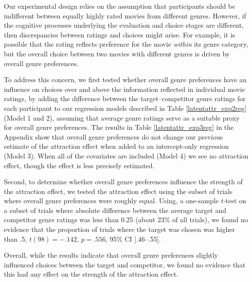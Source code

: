 \documentclass[12pt, a4paper]{article}
\begin{document}
Our experimental design relies on the assumption that participants should be indifferent between equally highly rated movies from different genres. However, if the cognitive processes underlying the evaluation and choice stages are different, then discrepancies between ratings and choices might arise. For example, it is possible that the rating reflects preference for the movie \textit{within} its genre category, but the overall choice between two movies with different genres is driven by overall genre preferences.

To address this concern, we first tested whether overall genre preferences have an influence on choices over and above the information reflected in individual movie ratings, by adding the difference between the target–competitor genre ratings for each participant to our regression models described in Table \ref{latentattr_exp2reg} (Model 1 and 2), assuming that average genre ratings serve as a suitable proxy for overall genre preferences. The results in Table \ref{latentattr_exp3reg} in the Appendix show that overall genre preferences do not change our previous estimate of the attraction effect when added to an intercept-only regression (Model 3). When all of the covariates are included (Model 4) we see no attraction effect, though the effect is less precisely estimated.

Second, to determine whether overall genre preferences influence the strength of the attraction effect, we tested the attraction effect using the subset of trials where overall genre preferences were roughly equal. Using, a one-sample $t$-test on a subset of trials where absolute difference between the average target and competitor genre ratings was less than 0.25 (about 23\% of all trials), we found no evidence that the proportion of trials where the target was chosen  was higher than .5, $t(98)=-.142$, $p=.556$, 95\% CI [.46--.55].
  
Overall, while the results indicate that overall genre preferences slightly influenced choices between the target and competitor, we found no evidence that this had any effect on the strength of the attraction effect.
\end{document}
